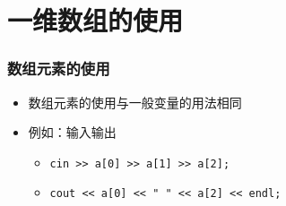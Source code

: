 \section{一维数组的使用}

\begin{frame}[fragile]
    \frametitle{数组元素的使用}

    \begin{itemize}
        \item 数组元素的使用与一般变量的用法相同

        \item 例如：输入输出

            \begin{itemize}
                \item \lstinline|cin >> a[0] >> a[1] >> a[2];|
                \item \lstinline|cout << a[0] << " " << a[2] << endl;|
            \end{itemize}

    \end{itemize}
\end{frame}

